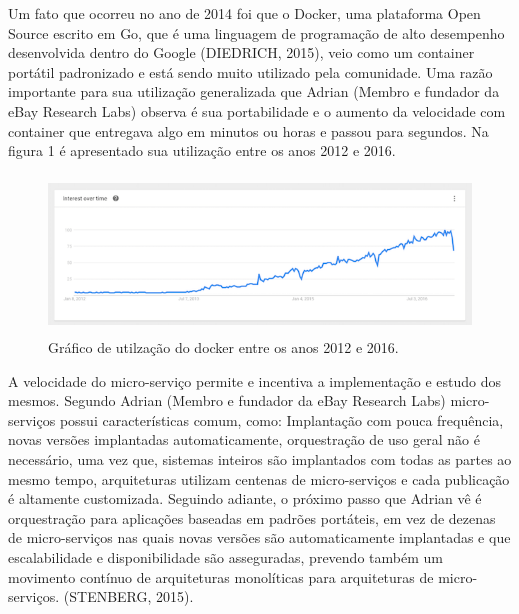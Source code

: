 Um fato que ocorreu no ano de 2014 foi que o Docker, uma plataforma Open Source escrito em Go, que é uma linguagem de programação de alto desempenho desenvolvida dentro do Google (DIEDRICH, 2015), veio como um container portátil padronizado e está sendo muito utilizado pela comunidade. Uma razão importante para sua utilização generalizada que Adrian (Membro e fundador da eBay Research Labs)  observa é sua portabilidade e o aumento da velocidade com container que entregava algo em minutos ou horas e passou para segundos. Na figura 1 é apresentado sua utilização entre os anos 2012 e 2016.



\begin{figure}[h]
\centering
\includegraphics[height=4.2cm]{imagens/docker}
\caption{Gráfico de utilzação do docker entre os anos 2012 e 2016.}
\label{fig:exemplo}
\end{figure}

A velocidade do micro-serviço permite e incentiva a implementação e estudo dos mesmos. Segundo Adrian (Membro e fundador da eBay Research Labs)  micro-serviços possui características comum, como: Implantação com pouca frequência, novas versões implantadas automaticamente, orquestração de uso geral não é necessário, uma vez que, sistemas inteiros são implantados com todas as partes ao mesmo tempo, arquiteturas utilizam centenas de micro-serviços e cada publicação é altamente customizada.
Seguindo adiante, o próximo passo que Adrian vê é orquestração para aplicações baseadas em padrões portáteis, em vez de dezenas de micro-serviços nas quais novas versões são automaticamente implantadas e que escalabilidade e disponibilidade são asseguradas, prevendo também um movimento contínuo de arquiteturas monolíticas para arquiteturas de micro-serviços. (STENBERG, 2015).

